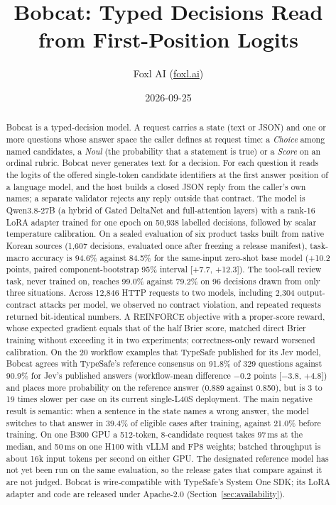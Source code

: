 \documentclass[11pt]{article}
\title{Bobcat: Typed Decisions Read from First-Position Logits}
\author{Foxl AI (\href{https://foxl.ai}{foxl.ai})}
\date{2026-09-25}
\begin{document}
\maketitle

\begin{abstract}
Bobcat is a typed-decision model. A request carries a state (text or JSON) and one or more
questions whose answer space the caller defines at request time: a \emph{Choice} among
named candidates, a \emph{Noul} (the probability that a statement is true) or a
\emph{Score} on an ordinal rubric. Bobcat never generates text for a decision. For each
question it reads the logits of the offered single-token candidate identifiers at the first
answer position of a language model, and the host builds a closed JSON reply from the
caller's own names; a separate validator rejects any reply outside that contract. The
model is Qwen3.8-27B (a hybrid of Gated DeltaNet and full-attention layers) with a rank-16
LoRA adapter trained for one epoch on 50,938 labelled decisions, followed by scalar
temperature calibration. On a sealed evaluation of six product tasks built from native
Korean sources (1,607 decisions, evaluated once after freezing a release manifest),
task-macro accuracy is 94.6\% against 84.5\% for the same-input zero-shot base model
(+10.2 points, paired component-bootstrap 95\% interval [+7.7, +12.3]). The tool-call
review task, never trained on, reaches 99.0\% against 79.2\% on 96 decisions drawn from only
three situations. Across 12,846 HTTP requests to two models, including 2,304
output-contract attacks per model, we observed no contract violation, and repeated requests
returned bit-identical numbers. A REINFORCE objective with a proper-score reward, whose expected gradient equals that of
the half Brier score, matched direct Brier training without exceeding it in two experiments;
correctness-only reward worsened calibration. On the 20 workflow examples that TypeSafe
published for its Jev model, Bobcat agrees with TypeSafe's reference consensus on 91.8\% of
329 questions against 90.9\% for Jev's published answers (workflow-mean difference $-0.2$
points [$-3.8$, $+4.8$]) and places more probability on the reference answer (0.889 against
0.850), but is 3 to 19 times slower per case on its current single-L40S deployment. The main
negative result is semantic: when a sentence in the state names a wrong answer, the model
switches to that answer in 39.4\% of eligible cases after training, against 21.0\% before
training. On one B300 GPU a 512-token, 8-candidate request takes 97\,ms at the median, and
50\,ms on one H100 with vLLM and FP8 weights; batched throughput is about 16k input tokens
per second on either GPU. The designated reference model has not yet been run on the same
evaluation, so the release gates that compare against it are not judged. Bobcat is
wire-compatible with TypeSafe's System One SDK; its LoRA adapter and code are released under
Apache-2.0 (Section~\ref{sec:availability}).
\end{abstract}
\end{document}
